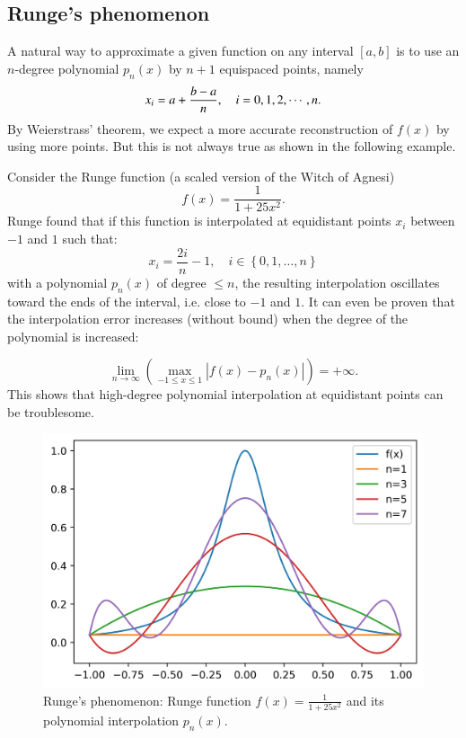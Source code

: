 \subsection{Runge's phenomenon}
A natural way to approximate a given function on any interval $[a,b]$ is to use an $n$-degree polynomial $p_n(x)$ by $n+1$ equispaced  points, namely
$$
x_i=a+{b-a\over n},\quad i=0,1,2,\cdots,n.
$$
By Weierstrass' theorem, we expect a more accurate reconstruction of $f(x)$ by using more points. But this is not always true as shown in the following example. 

Consider the Runge function (a scaled version of the Witch of Agnesi)
$$ 
f(x)=\frac{1}{1+25x^{2}}.
$$
Runge found that if this function is interpolated at equidistant points $x_i$ between $-1$ and $1$ such that:
$$
x_{i}={\frac{2i}{n}}-1,\quad i\in \left\{0,1,\dots ,n\right\}
$$
with a polynomial $p_n(x)$ of degree $\leq n$, the resulting interpolation oscillates toward the ends of the interval, i.e. close to $-1$ and $1$. It can even be proven that the interpolation error increases (without bound) when the degree of the polynomial is increased:

$$\lim_{{n\rightarrow \infty }}\left(\max_{{-1\leq x\leq 1}}|f(x)-p_{n}(x)|\right)=+\infty.$$
This shows that high-degree polynomial interpolation at equidistant points can be troublesome.

\begin{figure}
	\begin{center}
		\includegraphics[scale=0.1]{6DL/pic/Runge.jpeg}
		\caption{Runge's phenomenon: Runge function $f(x)=\frac{1}{1+25x^{2}}$ and its polynomial interpolation $p_n(x)$.}
	\end{center}
\end{figure}

